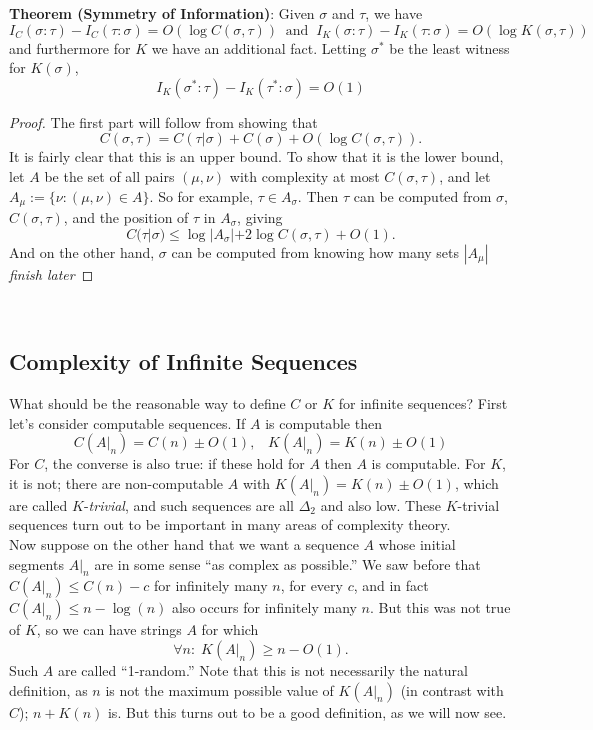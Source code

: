\documentclass{amsart}
\begin{document}
	\textbf{Theorem (Symmetry of Information)}: Given $\sigma$ and $\tau$, we have
	$$
	I_C(\sigma: \tau) - I_C(\tau:\sigma) = O(\log C(\sigma,\tau)) \;\; \text{and} \;\; I_K(\sigma: \tau) - I_K(\tau:\sigma) = O(\log K(\sigma,\tau))
	$$
	and furthermore for $K$ we have an additional fact. Letting $\sigma^*$ be the least witness for $K(\sigma)$,
	$$
	I_K(\sigma^*:\tau) - I_K(\tau^*:\sigma) = O(1)
	$$
	\begin{proof}
		The first part will follow from showing that 
		$$
		C(\sigma,\tau) = C(\tau | \sigma) + C(\sigma) + O(\log C(\sigma,\tau)).
		$$
		It is fairly clear that this is an upper bound. To show that it is the lower bound, let $A$ be the set of all pairs $(\mu,\nu)$ with complexity at most $C(\sigma,\tau)$, and let $A_{\mu} := \{\nu : (\mu,\nu)\in A\}$. So for example, $\tau \in A_{\sigma}$. Then $\tau$ can be computed from $\sigma$, $C(\sigma,\tau)$, and the position of $\tau$ in $A_{\sigma}$, giving
		$$
		C(\tau | \sigma) \leq \log|A_{\sigma}| + 2\log C(\sigma,\tau) + O(1).
		$$
		And on the other hand, $\sigma$ can be computed from knowing how many sets $|A_{\mu}|$ \textit{finish later}
	\end{proof}\\
	
	\subsection{Complexity of Infinite Sequences} What should be the reasonable way to define $C$ or $K$ for infinite sequences? First let's consider computable sequences. If $A$ is computable then 
	$$
	C(A|_n) = C(n) \pm O(1),\;\;\; K(A|_n) = K(n) \pm O(1)
	$$
	For $C$, the converse is also true: if these hold for $A$ then $A$ is computable. For $K$, it is not; there are non-computable $A$ with $K(A|_n) = K(n)\pm O(1)$, which are called $K$-\textit{trivial}, and such sequences are all $\Delta_2$ and also low. These $K$-trivial sequences turn out to be important in many areas of complexity theory.\\
	
	Now suppose on the other hand that we want a sequence $A$ whose initial segments $A|_n$ are in some sense ``as complex as possible.'' We saw before that $C(A|_n) \leq C(n)-c$ for infinitely many $n$, for every $c$, and in fact $C(A|_n)\leq n-\log(n)$ also occurs for infinitely many $n$. But this was not true of $K$, so we can have strings $A$ for which
	$$
	\forall n: \; K(A|_n) \geq n - O(1).
	$$
	Such $A$ are called ``1-random.'' Note that this is not necessarily the natural definition, as $n$ is not the maximum possible value of $K(A|_n)$ (in contrast with $C$); $n + K(n)$ is. But this turns out to be a good definition, as we will now see.\\
	
\end{document}

